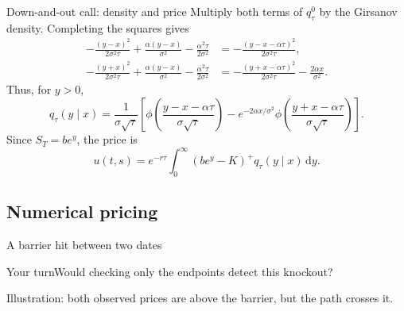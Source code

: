 \documentclass[handout,10pt,t,aspectratio=169]{beamer}
\newenvironment{pausebox}{\begin{block}{Your turn}}{\end{block}}
\newcommand{\dd}{\,\mathrm d}
\newcommand{\source}[1]{\vfill{\scriptsize\color{gray}#1\par}}
\begin{document}
\begin{frame}{Down-and-out call: density and price}
\small
Multiply both terms of \(q_\tau^0\) by the Girsanov density.
Completing the squares gives
\[
 \begin{aligned}
 -\frac{(y-x)^2}{2\sigma^2\tau}+\frac{\alpha(y-x)}{\sigma^2}
 -\frac{\alpha^2\tau}{2\sigma^2}
 &=-\frac{(y-x-\alpha\tau)^2}{2\sigma^2\tau},\\
 -\frac{(y+x)^2}{2\sigma^2\tau}+\frac{\alpha(y-x)}{\sigma^2}
 -\frac{\alpha^2\tau}{2\sigma^2}
 &=-\frac{(y+x-\alpha\tau)^2}{2\sigma^2\tau}-\frac{2\alpha x}{\sigma^2}.
 \end{aligned}
\]
Thus, for \(y>0\),
\[
 q_\tau(y\mid x)=\frac1{\sigma\sqrt\tau}
 \left[\phi\!\left(\frac{y-x-\alpha\tau}{\sigma\sqrt\tau}\right)
 -e^{-2\alpha x/\sigma^2}\phi\!\left(\frac{y+x-\alpha\tau}{\sigma\sqrt\tau}\right)\right].
\]
Since \(S_T=be^y\), the price is
\[
 \boxed{u(t,s)=e^{-r\tau}\int_0^\infty(be^y-K)^+q_\tau(y\mid x)\dd y.}
\]
\end{frame}

\subsection{Numerical pricing}


\begin{frame}{A barrier hit between two dates}

    \begin{center}\end{center}
    \begin{pausebox}Would checking only the endpoints detect this knockout?\end{pausebox}
    \source{Illustration: both observed prices are above the barrier, but the path crosses it.}
\end{frame}
\end{document}
